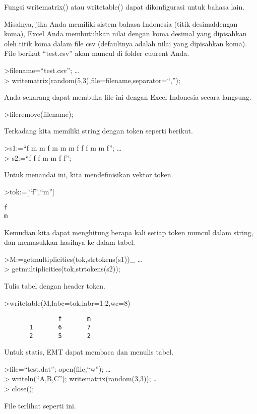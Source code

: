 \documentclass[
]{book}
\begin{document}
Fungsi writematrix() atau writetable() dapat dikonfigurasi untuk bahasa lain.

Misalnya, jika Anda memiliki sistem bahasa Indonesia (titik desimaldengan koma), Excel Anda membutuhkan nilai dengan koma desimal yang dipisahkan oleh titik koma dalam file csv (defaultnya adalah nilai yang dipisahkan koma). File berikut ``test.csv'' akan muncul di folder cuurent Anda.

\textgreater filename=``test.csv''; \ldots{}\\
\textgreater{} writematrix(random(5,3),file=filename,separator=``,'');

Anda sekarang dapat membuka file ini dengan Excel Indonesia secara langsung.

\textgreater fileremove(filename);

Terkadang kita memiliki string dengan token seperti berikut.

\textgreater s1:=``f m m f m m m f f f m m f''; \ldots{}\\
\textgreater{} s2:=``f f f m m f f'';

Untuk menandai ini, kita mendefinisikan vektor token.

\textgreater tok:={[}``f'',``m''{]}

\begin{verbatim}
f
m
\end{verbatim}

Kemudian kita dapat menghitung berapa kali setiap token muncul dalam string, dan memasukkan hasilnya ke dalam tabel.

\textgreater M:=getmultiplicities(tok,strtokens(s1))\_ \ldots{}\\
\textgreater{} getmultiplicities(tok,strtokens(s2));

Tulis tabel dengan header token.

\textgreater writetable(M,labc=tok,labr=1:2,wc=8)

\begin{verbatim}
               f       m
       1       6       7
       2       5       2
\end{verbatim}

Untuk statis, EMT dapat membaca dan menulis tabel.

\textgreater file=``test.dat''; open(file,``w''); \ldots{}\\
\textgreater{} writeln(``A,B,C''); writematrix(random(3,3)); \ldots{}\\
\textgreater{} close();

File terlihat seperti ini.
\end{document}

